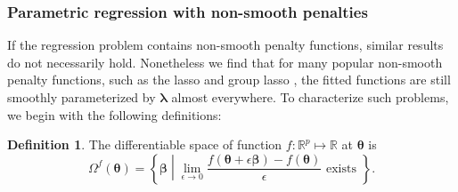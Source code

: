 \documentclass[12pt]{article} %
\theoremstyle{definition}
\newtheorem{definition}{Definition}
\begin{document}
\subsubsection{Parametric regression with non-smooth penalties}
\label{sec:param_nonsmooth}

If the regression problem contains non-smooth penalty functions, similar results do not necessarily hold. Nonetheless we find that for many popular non-smooth penalty functions, such as the lasso \citep{tibshirani1996regression} and group lasso \citep{yuan2006model}, the fitted functions are still smoothly parameterized by $\boldsymbol \lambda$ almost everywhere.
To characterize such problems, we begin with the following definitions:

\begin{definition}
	The differentiable space of function $f:\mathbb{R}^p \mapsto \mathbb{R}$ at $\boldsymbol{\theta}$ is
	\begin{equation}
	\Omega^{f}(\boldsymbol{\theta}) = \left \{ \boldsymbol{\beta} \middle | \lim_{\epsilon \rightarrow 0} \frac{f(\boldsymbol{\theta} + \epsilon \boldsymbol{\beta}) - f(\boldsymbol{\theta})}{\epsilon} \text{ exists } \right \}.
	\end{equation}
\end{definition}
\end{document}
